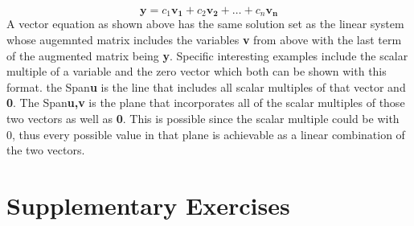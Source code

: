 \documentclass[12pt]{article}
\begin{document}
\begin{equation}
    \boldsymbol{y} = c_1 \boldsymbol{v_1} + c_2 \boldsymbol{v_2} + \dots +c_n \boldsymbol{v_n}
\end{equation}
\newline
A vector equation as shown above has the same solution set as the linear system whose augemnted matrix includes the variables \textbf{v} from above %
with the last term of the augmented matrix being \textbf{y}. Specific interesting examples include the scalar multiple of a variable and the zero vector %
which both can be shown with this format. the Span{\textbf{u}} is the line that includes all scalar multiples of that vector and \textbf{0}. The Span{\textbf{u,v}} %
is the plane that incorporates all of the scalar multiples of those two vectors as well as \textbf{0}. This is possible since the scalar multiple could be with 0, %
thus every possible value in that plane is achievable as a linear combination of the two vectors.  
\newline
\section{Supplementary Exercises}
\end{document}
